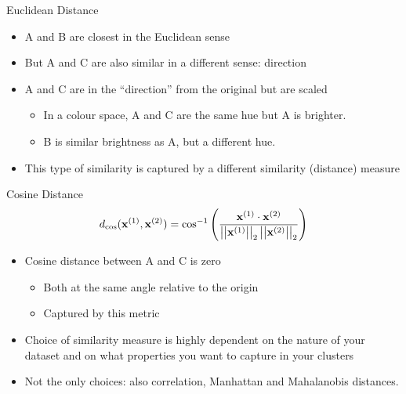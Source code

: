 \documentclass{beamer}
\begin{document}
\begin{frame}{Euclidean Distance}
  \begin{itemize}
    \item A and B are closest in the Euclidean sense
    \item But A and C are also similar in a different sense: direction
    \item A and C are in the ``direction'' from the original but are scaled
      \begin{itemize}
        \item In a colour space, A and C are the same hue but A is brighter.
        \item B is similar brightness as A, but a different hue.
      \end{itemize}
    \item This type of similarity is captured by a different similarity (distance) measure
  \end{itemize}
\end{frame}

\begin{frame}{Cosine Distance}
  \begin{equation*}
    d_\mathrm{cos}(\mathbf{x}^{(1)},\mathbf{x}^{(2)}) = \cos^{-1}\left(\frac{\mathbf{x}^{(1)}\cdot\mathbf{x}^{(2)}}{\left\lvert\left\lvert \mathbf{x}^{(1)}\right\rvert\right\rvert_2\left\lvert\left\lvert \mathbf{x}^{(2)}\right\rvert\right\rvert_2}\right)
  \end{equation*}

  \begin{itemize}
    \item Cosine distance between A and C is zero
      \begin{itemize}
        \item Both at the same angle relative to the origin
        \item Captured by this metric
      \end{itemize}
    \item Choice of similarity measure is highly dependent on the nature of your dataset and on what properties you want to capture in your clusters
    \item Not the only choices: also correlation, Manhattan and Mahalanobis distances.
  \end{itemize}
\end{frame}
\end{document}
